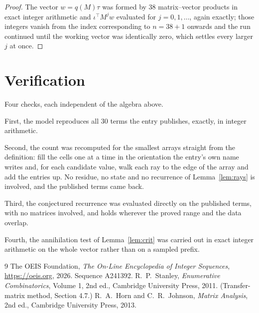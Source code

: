 \documentclass[11pt,a4paper]{article}
\theoremstyle{plain}
\theoremstyle{definition}
\begin{document}
\begin{proof}
The vector $w=q(M)\tau$ was formed by $38$ matrix--vector products in exact integer
arithmetic and $\iota^{\!\top}M^{j}w$ evaluated for $j=0,1,\dots$, again exactly; those
integers vanish from the index corresponding to $n=38+1$ onwards and the run continued
until the working vector was identically zero, which settles every larger $j$ at once.
\end{proof}

\section{Verification}

Four checks, each independent of the algebra above.

First, the model reproduces all $30$ terms the entry publishes, exactly, in integer
arithmetic.

Second, the count was recomputed for the smallest arrays straight from the definition: fill the
cells one at a time in the orientation the entry's own name writes and, for each candidate
value, walk each ray to the edge of the array and add the entries up. No residue, no state and
no recurrence of Lemma~\ref{lem:rays} is involved, and the published terms came back.

Third, the conjectured recurrence was evaluated directly on the published terms, with no
matrices involved, and holds wherever the proved range and the data overlap.

Fourth, the annihilation test of Lemma~\ref{lem:crit} was carried out in exact integer
arithmetic on the whole vector rather than on a sampled prefix.

\begin{thebibliography}{9}
 The OEIS Foundation, \emph{The On-Line Encyclopedia of Integer
Sequences}, \url{https://oeis.org}, 2026. Sequence A241392.
 R.~P.~Stanley, \emph{Enumerative Combinatorics}, Volume 1, 2nd ed.,
Cambridge University Press, 2011. (Transfer-matrix method, Section 4.7.)
 R.~A.~Horn and C.~R.~Johnson, \emph{Matrix Analysis}, 2nd ed., Cambridge
University Press, 2013.
\end{thebibliography}
\end{document}
